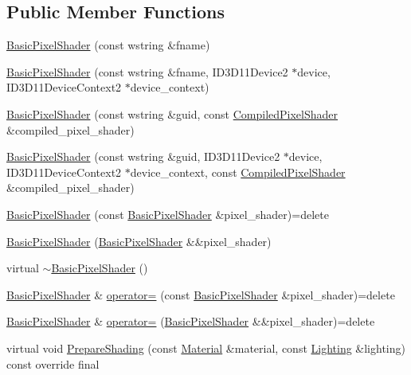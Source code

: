 \subsection*{Public Member Functions}
\begin{DoxyCompactItemize}
\item 
\hyperlink{classmage_1_1_basic_pixel_shader_ae89993e3ba1ab6461e4e984ee8c7b819}{Basic\+Pixel\+Shader} (const wstring \&fname)
\item 
\hyperlink{classmage_1_1_basic_pixel_shader_a6d4283d378d5655e25f7c20014a9663e}{Basic\+Pixel\+Shader} (const wstring \&fname, I\+D3\+D11\+Device2 $\ast$device, I\+D3\+D11\+Device\+Context2 $\ast$device\+\_\+context)
\item 
\hyperlink{classmage_1_1_basic_pixel_shader_ad7be28d3429b13d7adf6c150c173a117}{Basic\+Pixel\+Shader} (const wstring \&guid, const \hyperlink{structmage_1_1_compiled_pixel_shader}{Compiled\+Pixel\+Shader} \&compiled\+\_\+pixel\+\_\+shader)
\item 
\hyperlink{classmage_1_1_basic_pixel_shader_a931200fdba2748e374103d85a66690c5}{Basic\+Pixel\+Shader} (const wstring \&guid, I\+D3\+D11\+Device2 $\ast$device, I\+D3\+D11\+Device\+Context2 $\ast$device\+\_\+context, const \hyperlink{structmage_1_1_compiled_pixel_shader}{Compiled\+Pixel\+Shader} \&compiled\+\_\+pixel\+\_\+shader)
\item 
\hyperlink{classmage_1_1_basic_pixel_shader_ab82055206ff2a05b73f18ce23353a4bb}{Basic\+Pixel\+Shader} (const \hyperlink{classmage_1_1_basic_pixel_shader}{Basic\+Pixel\+Shader} \&pixel\+\_\+shader)=delete
\item 
\hyperlink{classmage_1_1_basic_pixel_shader_a0a5366edb694e78e4c8075fad70b7dff}{Basic\+Pixel\+Shader} (\hyperlink{classmage_1_1_basic_pixel_shader}{Basic\+Pixel\+Shader} \&\&pixel\+\_\+shader)
\item 
virtual \hyperlink{classmage_1_1_basic_pixel_shader_a7b4ac308850eb9ad55cbbd1e6389271b}{$\sim$\+Basic\+Pixel\+Shader} ()
\item 
\hyperlink{classmage_1_1_basic_pixel_shader}{Basic\+Pixel\+Shader} \& \hyperlink{classmage_1_1_basic_pixel_shader_a9656fdae2d17691d3e7dd850e7844efb}{operator=} (const \hyperlink{classmage_1_1_basic_pixel_shader}{Basic\+Pixel\+Shader} \&pixel\+\_\+shader)=delete
\item 
\hyperlink{classmage_1_1_basic_pixel_shader}{Basic\+Pixel\+Shader} \& \hyperlink{classmage_1_1_basic_pixel_shader_a5d6224f0454d1d1f9583f6b9f8ad8201}{operator=} (\hyperlink{classmage_1_1_basic_pixel_shader}{Basic\+Pixel\+Shader} \&\&pixel\+\_\+shader)=delete
\item 
virtual void \hyperlink{classmage_1_1_basic_pixel_shader_a67ce881c6c02b2ceabca29cd3b6a4a89}{Prepare\+Shading} (const \hyperlink{structmage_1_1_material}{Material} \&material, const \hyperlink{structmage_1_1_lighting}{Lighting} \&lighting) const override final
\end{DoxyCompactItemize}
